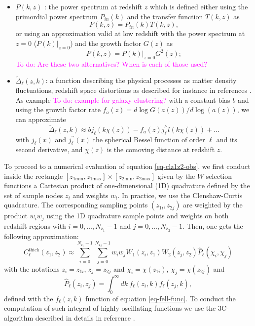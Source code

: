 \documentclass[\docopts]{\docclass}
\newcommand{\todo}[1]{\textcolor{magenta}{To do: #1}}
\newcommand{\mrm}[1]{\mathrm{#1}}
\begin{document}
\begin{itemize}
\item  $P(k,z)$ : the power spectrum at redshift $z$ which is defined either using the primordial power spectrum $P_{in}(k)$ and the transfer function $T(k,z)$ as
\begin{equation}
P(k,z) = P_{in}(k) T(k,z),
\end{equation} 
or using an approximation valid at low redshift  with the power spectrum at $z=0$ ($P(k)|_{z=0}$) and the growth factor $G(z)$ as
\begin{equation}
P(k,z) = P(k)|_{z=0} G^2(z);
\end{equation} 
\todo{Are these two alternatives? When is each of those used?}

\item $\widetilde{\Delta}_\ell(z,k)$: a function describing the physical processes as matter density fluctuations, redshift space distortions as described for instance in references \citet{2008cmb..book.....D,2009PhRvD..80h3514Y,2010PhRvD..82h3508Y,2011PhRvD..84d3516C,2011PhRvD..84f3505B}. As example \todo{example for galaxy clustering?} with a constant bias $b$ and using the growth factor rate $f_a(z) = d\log G(a(z))/d\log(a(z))$, we can approximate
\begin{equation}
 \widetilde{\Delta}_\ell(z,k) \approx b j_\ell(k \chi(z)) - f_a(z) j_\ell^{\prime\prime}l(k \chi(z)) + \dots
\end{equation}
with $j_\ell(x)$ and $j_\ell^{\prime\prime}(x)$ the spherical Bessel function of order $\ell$ and its second derivative, and $\chi(z)$ is the comoving distance at redshift $z$.
\end{itemize}

To proceed to a numerical evaluation of equation \ref{eq-clz1z2-obs}, we first conduct  inside the rectangle $ [z_{1\mrm{min}},z_{1\mrm{max}}] \times [z_{2\mrm{min}},z_{2\mrm{max}}]$ given by the $W$ selection functions a Cartesian product of one-dimensional (1D) quadrature 
 defined by the set of sample nodes $z_i$ and weights $w_i$. In practice, we use the Clenshaw-Curtis quadrature.   The corresponding sampling points $(z_{1i},z_{2j})$ are weighted by the product  $w_i w_j$ using the 1D quadrature sample points and weights on both redshift regions with $i=0,\dots, N_{\mrm{z}_1}-1$ and $j=0,\dots,N_{\mrm{z}_2}-1$. Then, one gets the following approximation:
\begin{equation}
C^{\mrm{thick}}_{\ell}(z_1, z_2) \approx  \sum_{i=0}^{N_{\mrm{z}_1}-1}\sum_{j=0}^{N_{\mrm{z}_2}-1} w_i w_j W_1(z_i,z_1)W_2(z_j,z_2) \widehat{P}_\ell(\chi_i,\chi_j)
\label{eq-cross-zquadra}
\end{equation}
with the notations $z_i = z_{1i}$, $z_j = z_{2j}$ and  $\chi_i = \chi(z_{1i})$, $\chi_j = \chi(z_{2j})$ and
\begin{equation}
\widehat{P}_\ell(z_i,z_j) =   \int_0^\infty dk\ f_\ell(z_i,k) f_\ell(z_j,k)
\label{eq-Pellzizj}
,\end{equation}
defined with the $f_\ell(z,k)$ function of equation \ref{eq-fell-func}. 
To conduct the computation of such integral of highly oscillating functions we use the 3C-algorithm described in details in reference \citep{2017arXiv170103592C}.
\end{document}
